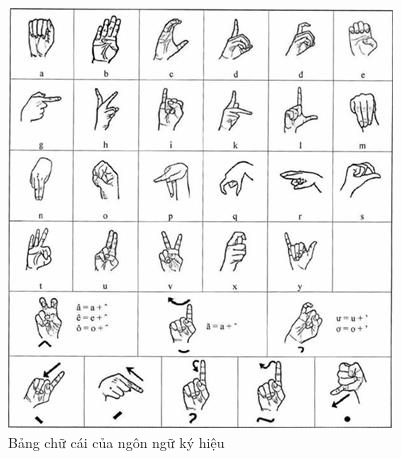 \begin{figure}[H]
    \centering
    \includegraphics{Images/Theoretical basis/bangchu.jpg}
    \caption{Bảng chữ cái của ngôn ngữ ký hiệu}
    \label{fig:enter-label}
\end{figure}



